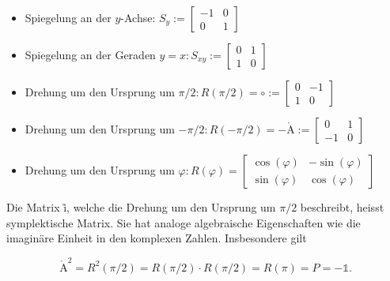 \documentclass[10pt]{article}
\def\AA{\mathring{\mathrm{A}}}
\begin{document}
\begin{itemize}
  \item Spiegelung an der $y$-Achse: $S_{y}:=\left[\begin{array}{rr}-1 & 0 \\ 0 & 1\end{array}\right]$
  \item Spiegelung an der Geraden $y=x: S_{x y}:=\left[\begin{array}{ll}0 & 1 \\ 1 & 0\end{array}\right]$
  \item Drehung um den Ursprung um $\pi / 2: R(\pi / 2)=\circ:=\left[\begin{array}{rr}0 & -1 \\ 1 & 0\end{array}\right]$
  \item Drehung um den Ursprung um $-\pi / 2: R(-\pi / 2)=-\AA:=\left[\begin{array}{rr}0 & 1 \\ -1 & 0\end{array}\right]$
  \item Drehung um den Ursprung um $\varphi: R(\varphi)=\left[\begin{array}{rr}\cos (\varphi) & -\sin (\varphi) \\ \sin (\varphi) & \cos (\varphi)\end{array}\right]$
\end{itemize}

Die Matrix i̊, welche die Drehung um den Ursprung um $\pi / 2$ beschreibt, heisst symplektische Matrix. Sie hat analoge algebraische Eigenschaften wie die imaginäre Einheit in den komplexen Zahlen. Insbesondere gilt


\begin{equation*}
\AA^{2}=R^{2}(\pi / 2)=R(\pi / 2) \cdot R(\pi / 2)=R(\pi)=P=-\mathbb{1} . \tag{6.51}
\end{equation*}
\end{document}
